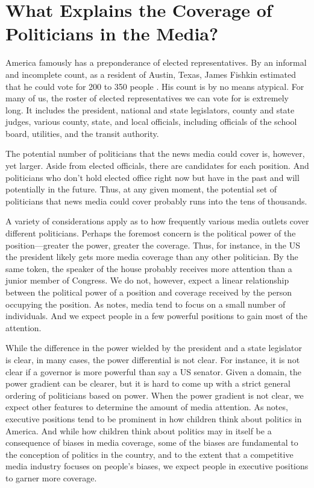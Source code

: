 \documentclass[12pt, letterpaper]{article}
\begin{document}
\section*{What Explains the Coverage of Politicians in the Media?}
America famously has a preponderance of elected representatives. By an informal and incomplete count, as a resident of Austin, Texas, James Fishkin estimated that he could vote for 200 to 350 people \citep{fishkin1997}. His count is by no means atypical. For many of us, the roster of elected representatives we can vote for is extremely long. It includes the president, national and state legislators, county and state judges, various county, state, and local officials, including officials of the school board, utilities, and the transit authority.

The potential number of politicians that the news media could cover is, however, yet larger.  Aside from elected officials, there are candidates for each position. And politicians who don't hold elected office right now but have in the past and will potentially in the future. Thus, at any given moment, the potential set of politicians that news media could cover probably runs into the tens of thousands.

A variety of considerations apply as to how frequently various media outlets cover different politicians. Perhaps the foremost concern is the political power of the position---greater the power, greater the coverage. Thus, for instance, in the US the president likely gets more media coverage than any other politician. By the same token, the speaker of the house probably receives more attention than a junior member of Congress. We do not, however, expect a linear relationship between the political power of a position and coverage received by the person occupying the position. As \citet{gamson1994} notes, media tend to focus on a small number of individuals. And we expect people in a few powerful positions to gain most of the attention.

While the difference in the power wielded by the president and a state legislator is clear, in many cases, the power differential is not clear. For instance, it is not clear if a governor is more powerful than say a US senator. Given a domain, the power gradient can be clearer, but it is hard to come up with a strict general ordering of politicians based on power. When the power gradient is not clear, we expect other features to determine the amount of media attention. As \citet{greenstein1965} notes, executive positions tend to be prominent in how children think about politics in America. And while how children think about politics may in itself be a consequence of biases in media coverage, some of the biases are fundamental to the conception of politics in the country, and to the extent that a competitive media industry focuses on people's biases, we expect people in executive positions to garner more coverage.
\end{document}
